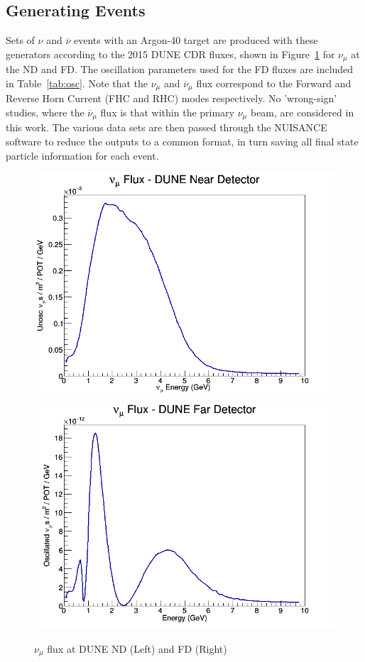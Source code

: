 \documentclass[12pt]{article}
\begin{document}
\subsection{Generating Events}
\label{subsec:events}
Sets of $\nu$ and $\overline{\nu}$ events with an Argon-40 target are produced with these generators according to the 2015 DUNE CDR fluxes, shown in Figure~\ref{fig:dune_flux} for $\nu_{\mu}$ at the ND and FD. The oscillation parameters used for the FD fluxes are included in Table~\ref{tab:osc}. Note that the $\nu_\mu$ and $\overline{\nu}_\mu$ flux correspond to the Forward and Reverse Horn Current (FHC and RHC) modes respectively. No 'wrong-sign' studies, where the $\overline{\nu}_\mu$ flux is that within the primary $\nu_\mu$ beam, are considered in this work. The various data sets are then passed through the NUISANCE\cite{NUISANCE} software to reduce the outputs to a common format, in turn saving all final state particle information for each event. 
\begin{figure}[h]
\centering
{}
\includegraphics[width=\linewidth]{Dune_Flux/numu_ND_flux.png}
\endminipage
{}
\includegraphics[width=\linewidth]{Dune_Flux/numu_FD_flux.png}
\endminipage
\caption{$\nu_\mu$ flux at DUNE ND (Left) and FD (Right)}
\label{fig:dune_flux}
\end{figure}
\end{document}
